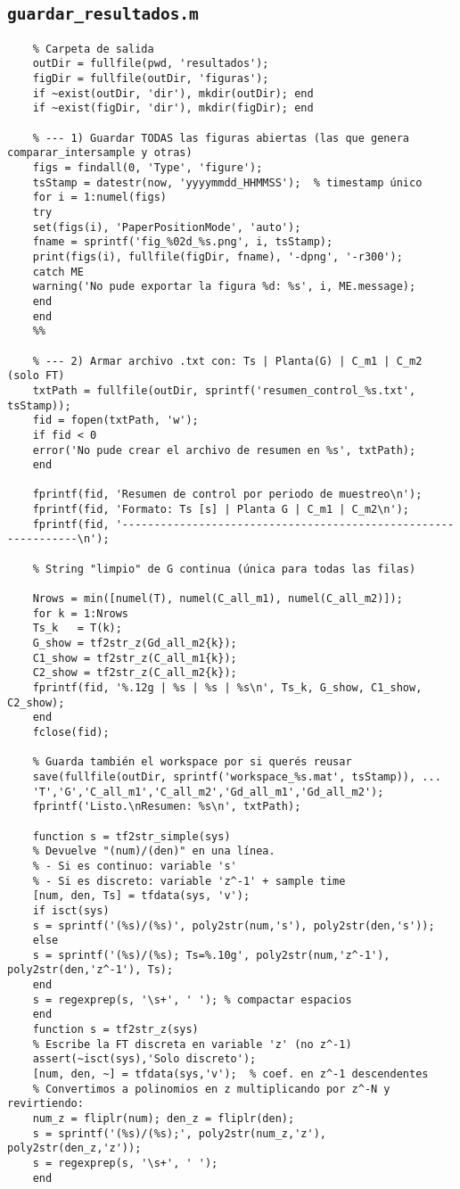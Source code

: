 \subsection{\texttt{guardar\_resultados.m}}
\begin{lstlisting}[style=matlabstyle,caption={Guardado de resultados y figuras.}]
	%% ================== Guardar figuras e informe ==================
	% Carpeta de salida
	outDir = fullfile(pwd, 'resultados');
	figDir = fullfile(outDir, 'figuras');
	if ~exist(outDir, 'dir'), mkdir(outDir); end
	if ~exist(figDir, 'dir'), mkdir(figDir); end
	
	% --- 1) Guardar TODAS las figuras abiertas (las que genera comparar_intersample y otras)
	figs = findall(0, 'Type', 'figure');
	tsStamp = datestr(now, 'yyyymmdd_HHMMSS');  % timestamp único
	for i = 1:numel(figs)
	try
	set(figs(i), 'PaperPositionMode', 'auto');
	fname = sprintf('fig_%02d_%s.png', i, tsStamp);
	print(figs(i), fullfile(figDir, fname), '-dpng', '-r300');
	catch ME
	warning('No pude exportar la figura %d: %s', i, ME.message);
	end
	end
	%%
	
	% --- 2) Armar archivo .txt con: Ts | Planta(G) | C_m1 | C_m2 (solo FT)
	txtPath = fullfile(outDir, sprintf('resumen_control_%s.txt', tsStamp));
	fid = fopen(txtPath, 'w');
	if fid < 0
	error('No pude crear el archivo de resumen en %s', txtPath);
	end
	
	fprintf(fid, 'Resumen de control por periodo de muestreo\n');
	fprintf(fid, 'Formato: Ts [s] | Planta G | C_m1 | C_m2\n');
	fprintf(fid, '---------------------------------------------------------------\n');
	
	% String "limpio" de G continua (única para todas las filas)
	
	Nrows = min([numel(T), numel(C_all_m1), numel(C_all_m2)]);
	for k = 1:Nrows
	Ts_k   = T(k);
	G_show = tf2str_z(Gd_all_m2{k});
	C1_show = tf2str_z(C_all_m1{k});
	C2_show = tf2str_z(C_all_m2{k});
	fprintf(fid, '%.12g | %s | %s | %s\n', Ts_k, G_show, C1_show, C2_show);
	end
	fclose(fid);
	
	% Guarda también el workspace por si querés reusar
	save(fullfile(outDir, sprintf('workspace_%s.mat', tsStamp)), ...
	'T','G','C_all_m1','C_all_m2','Gd_all_m1','Gd_all_m2');
	fprintf('Listo.\nResumen: %s\n', txtPath);
	
	function s = tf2str_simple(sys)
	% Devuelve "(num)/(den)" en una línea.
	% - Si es continuo: variable 's'
	% - Si es discreto: variable 'z^-1' + sample time
	[num, den, Ts] = tfdata(sys, 'v');
	if isct(sys)
	s = sprintf('(%s)/(%s)', poly2str(num,'s'), poly2str(den,'s'));
	else
	s = sprintf('(%s)/(%s); Ts=%.10g', poly2str(num,'z^-1'), poly2str(den,'z^-1'), Ts);
	end
	s = regexprep(s, '\s+', ' '); % compactar espacios
	end
	function s = tf2str_z(sys)
	% Escribe la FT discreta en variable 'z' (no z^-1)
	assert(~isct(sys),'Solo discreto');
	[num, den, ~] = tfdata(sys,'v');  % coef. en z^-1 descendentes
	% Convertimos a polinomios en z multiplicando por z^-N y revirtiendo:
	num_z = fliplr(num); den_z = fliplr(den);
	s = sprintf('(%s)/(%s);', poly2str(num_z,'z'), poly2str(den_z,'z'));
	s = regexprep(s, '\s+', ' ');
	end
\end{lstlisting}

